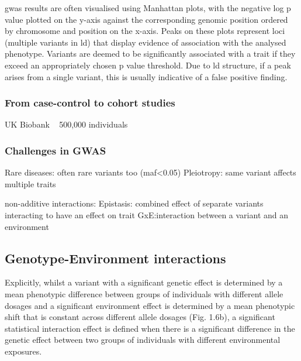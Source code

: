 \cite{mccarthy2008genome}

\gls{gwas} results are often visualised using Manhattan plots, with the negative log p value plotted on the y-axis against the corresponding genomic position ordered by chromosome and position on the x-axis. 
Peaks on these plots represent loci (multiple variants in \gls{ld}) that display evidence of association with the analysed phenotype. 
Variants are deemed to be significantly associated with a trait if they exceed an appropriately chosen p value threshold. 
Due to \gls{ld} structure, if a peak arises from a single variant, this is usually indicative of a false positive finding.

\subsubsection{From case-control to cohort studies}

UK Biobank ~ 500,000 individuals

\subsubsection{Challenges in GWAS}

Rare diseases: often rare variants too (\gls{maf}<0.05)
Pleiotropy: same variant affects multiple traits

non-additive interactions:
Epistasis: combined effect of separate variants interacting to have an effect on trait
GxE:interaction between a variant and an environment


\subsection{Genotype-Environment interactions}

Explicitly, whilst a variant with a significant genetic effect is determined by a mean phenotypic difference between groups of individuals with different allele dosages and a significant environment effect is determined by a mean phenotypic shift that is constant across different allele dosages (Fig. 1.6b), a significant statistical interaction effect is defined when there is a significant difference in the genetic effect between two groups of individuals with different environmental exposures.


